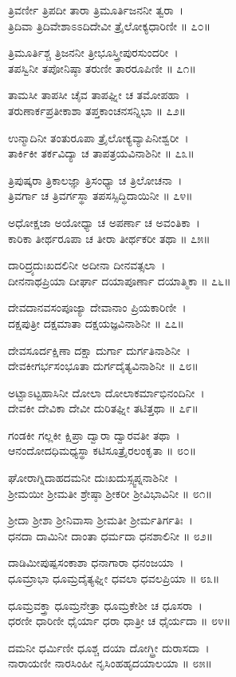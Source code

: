 ತ್ರಿವರ್ಣೀ ತ್ರಿಪದೀ ತಾರಾ ತ್ರಿಮೂರ್ತಿಜನನೀ ತ್ವರಾ~।\\
ತ್ರಿದಿವಾ ತ್ರಿದಿವೇಶಾಽಽದಿದೇವೀ ತ್ರೈಲೋಕ್ಯಧಾರಿಣೀ ॥ ೭೦॥

ತ್ರಿಮೂರ್ತಿಶ್ಚ ತ್ರಿಜನನೀ ತ್ರೀಭೂಸ್ತ್ರೀಪುರಸುಂದರೀ~।\\
ತಪಸ್ವಿನೀ ತಪೋನಿಷ್ಠಾ ತರುಣೀ ತಾರರೂಪಿಣೀ ॥ ೭೧॥

ತಾಮಸೀ ತಾಪಸೀ ಚೈವ ತಾಪಘ್ನೀ ಚ ತಮೋಪಹಾ~।\\
ತರುಣಾರ್ಕಪ್ರತೀಕಾಶಾ ತಪ್ತಕಾಂಚನಸನ್ನಿಭಾ ॥ ೭೨॥

ಉನ್ಮಾದಿನೀ ತಂತುರೂಪಾ ತ್ರೈಲೋಕ್ಯವ್ಯಾಪಿನೀಶ್ವರೀ~।\\
ತಾರ್ಕಿಕೀ ತರ್ಕವಿದ್ಯಾ ಚ ತಾಪತ್ರಯವಿನಾಶಿನೀ ॥ ೭೩॥

ತ್ರಿಪುಷ್ಕರಾ ತ್ರಿಕಾಲಜ್ಞಾ ತ್ರಿಸಂಧ್ಯಾ ಚ ತ್ರಿಲೋಚನಾ~।\\
ತ್ರಿವರ್ಗಾ ಚ ತ್ರಿವರ್ಗಸ್ಥಾ ತಪಸಸ್ಸಿದ್ಧಿದಾಯಿನೀ ॥ ೭೪॥

ಅಧೋಕ್ಷಜಾ ಅಯೋಧ್ಯಾ ಚ ಅಪರ್ಣಾ ಚ ಅವಂತಿಕಾ~।\\
ಕಾರಿಕಾ ತೀರ್ಥರೂಪಾ ಚ ತೀರಾ ತೀರ್ಥಕರೀ ತಥಾ ॥ ೭೫॥

ದಾರಿದ್ರ್ಯದುಃಖದಲಿನೀ ಅದೀನಾ ದೀನವತ್ಸಲಾ~।\\
ದೀನನಾಥಪ್ರಿಯಾ ದೀರ್ಘಾ ದಯಾಪೂರ್ಣಾ ದಯಾತ್ಮಿಕಾ ॥ ೭೬॥

ದೇವದಾನವಸಂಪೂಜ್ಯಾ ದೇವಾನಾಂ ಪ್ರಿಯಕಾರಿಣೀ~।\\
ದಕ್ಷಪುತ್ರೀ ದಕ್ಷಮಾತಾ ದಕ್ಷಯಜ್ಞವಿನಾಶಿನೀ ॥ ೭೭॥

ದೇವಸೂರ್ದಕ್ಷಿಣಾ ದಕ್ಷಾ ದುರ್ಗಾ ದುರ್ಗತಿನಾಶಿನೀ~।\\
ದೇವಕೀಗರ್ಭಸಂಭೂತಾ ದುರ್ಗದೈತ್ಯವಿನಾಶಿನೀ ॥ ೭೮॥

ಅಟ್ಟಾಽಟ್ಟಹಾಸಿನೀ ದೋಲಾ ದೋಲಾಕರ್ಮಾಭಿನಂದಿನೀ~।\\
ದೇವಕೀ ದೇವಿಕಾ ದೇವೀ ದುರಿತಘ್ನೀ ತಟಿತ್ತಥಾ ॥ ೭೯॥

ಗಂಡಕೀ ಗಲ್ಲಕೀ ಕ್ಷಿಪ್ರಾ ದ್ವಾರಾ ದ್ವಾರವತೀ ತಥಾ~।\\
ಆನಂದೋದಧಿಮಧ್ಯಸ್ಥಾ ಕಟಿಸೂತ್ರೈರಲಂಕೃತಾ ॥ ೮೦॥

ಘೋರಾಗ್ನಿದಾಹದಮನೀ ದುಃಖದುಸ್ಸ್ವಪ್ನನಾಶಿನೀ~।\\
ಶ್ರೀಮಯೀ ಶ್ರೀಮತೀ ಶ್ರೇಷ್ಠಾ ಶ್ರೀಕರೀ ಶ್ರೀವಿಭಾವಿನೀ ॥ ೮೧॥

ಶ್ರೀದಾ ಶ್ರೀಶಾ ಶ್ರೀನಿವಾಸಾ ಶ್ರೀಮತೀ ಶ್ರೀರ್ಮತಿರ್ಗತಿಃ~।\\
ಧನದಾ ದಾಮಿನೀ ದಾಂತಾ ಧರ್ಮದಾ ಧನಶಾಲಿನೀ ॥ ೮೨॥

ದಾಡಿಮೀಪುಷ್ಪಸಂಕಾಶಾ ಧನಾಗಾರಾ ಧನಂಜಯಾ~।\\
ಧೂಮ್ರಾಭಾ ಧೂಮ್ರದೈತ್ಯಘ್ನೀ ಧವಲಾ ಧವಲಪ್ರಿಯಾ ॥ ೮೩॥

ಧೂಮ್ರವಕ್ತ್ರಾ ಧೂಮ್ರನೇತ್ರಾ ಧೂಮ್ರಕೇಶೀ ಚ ಧೂಸರಾ~।\\
ಧರಣೀ ಧಾರಿಣೀ ಧೈರ್ಯಾ ಧರಾ ಧಾತ್ರೀ ಚ ಧೈರ್ಯದಾ ॥ ೮೪॥

ದಮನೀ ಧರ್ಮಿಣೀ ಧೂಶ್ಚ ದಯಾ ದೋಗ್ಧ್ರೀ ದುರಾಸದಾ~।\\
ನಾರಾಯಣೀ ನಾರಸಿಂಹೀ ನೃಸಿಂಹಹೃದಯಾಲಯಾ ॥ ೮೫॥

